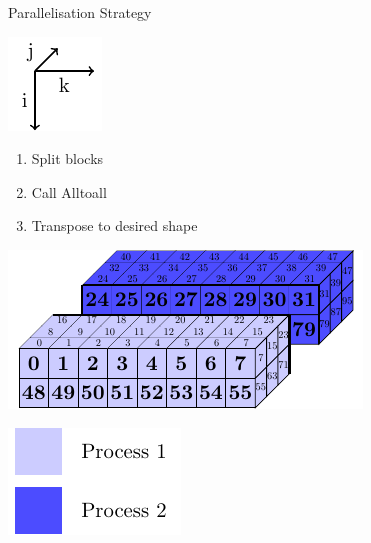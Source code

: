 \documentclass{beamer}
\begin{document}
\begin{frame}{Parallelisation Strategy}
 \begin{minipage}{.3\textwidth}
 \includegraphics[width=.4\textwidth]{SplitConcat3D/Axes}
 \vspace{4em}
 
  \begin{enumerate}
   \item Split blocks 
   \item Call Alltoall
   \item Transpose to desired shape
  \end{enumerate}
  
  \vspace{4em}
 \end{minipage}
 \begin{minipage}{.65\textwidth}
  \includegraphics[width=\textwidth]{SplitConcat3D/Layout1Distrib2}\vspace{0pt}
  
  \vspace{1em}
  
  \hfill\includegraphics[width=.3\textwidth]{SplitConcat3D/Legend}
 \end{minipage}
\end{frame}
\end{document}
